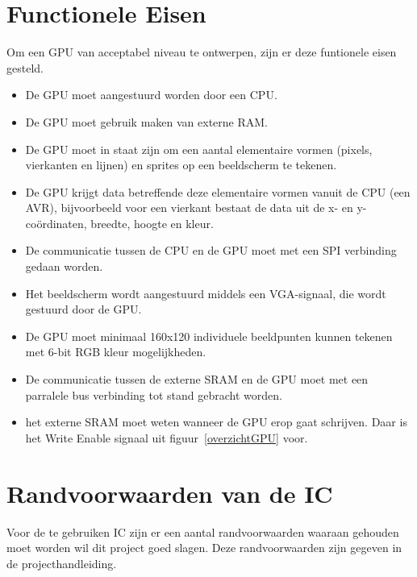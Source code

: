 \documentclass{scrartcl} %
\begin{document}
\section {Functionele Eisen}
Om een GPU van acceptabel niveau te ontwerpen, zijn er deze funtionele eisen gesteld.
\begin {itemize}
\item De GPU moet aangestuurd worden door een CPU.
\item De GPU moet gebruik maken van externe RAM.
\item De GPU moet in staat zijn om een aantal elementaire vormen (pixels, vierkanten en lijnen) en sprites op een beeldscherm te tekenen.
\item De GPU krijgt data betreffende deze elementaire vormen vanuit de CPU (een AVR), bijvoorbeeld voor een vierkant bestaat de data uit de x- en y-coördinaten, breedte, hoogte en kleur.
\item De communicatie tussen de CPU en de GPU moet met een SPI verbinding gedaan worden.
\item Het beeldscherm wordt aangestuurd middels een VGA-signaal, die wordt gestuurd door de GPU.
\item De GPU moet minimaal 160x120 individuele beeldpunten kunnen tekenen met 6-bit RGB kleur mogelijkheden.
\item De communicatie tussen de externe SRAM en de GPU moet met een parralele bus verbinding tot stand gebracht worden.
\item het externe SRAM moet weten wanneer de GPU erop gaat schrijven. Daar is het Write Enable signaal uit figuur~\ref{overzichtGPU} voor.
\end{itemize}

\section {Randvoorwaarden van de IC}

Voor de te gebruiken IC zijn er een aantal randvoorwaarden waaraan gehouden moet worden wil dit project goed slagen. Deze randvoorwaarden zijn gegeven in de projecthandleiding\cite {epo3-manual}.
\end{document}
